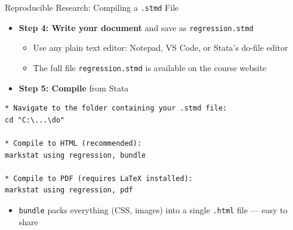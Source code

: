 \documentclass[dvipsnames,hyperref={pdfpagelabels=false}]{beamer}
\begin{document}
\begin{frame}[fragile]{Reproducible Research: Compiling a \texttt{.stmd} File}

	\begin{itemize}
		\item \textbf{Step 4: Write your document} and save as \texttt{regression.stmd}
		\vspace{0.2cm}
		\begin{itemize}
			\item Use any plain text editor: Notepad, VS Code, or Stata's do-file editor
			\vspace{0.1cm}
			\item The full file \texttt{regression.stmd} is available on the course website
		\end{itemize}
		\vspace{0.3cm}
		\item \textbf{Step 5: Compile} from Stata
	\end{itemize}

\begin{lstlisting}
* Navigate to the folder containing your .stmd file:
cd "C:\...\do"

* Compile to HTML (recommended):
markstat using regression, bundle

* Compile to PDF (requires LaTeX installed):
markstat using regression, pdf
\end{lstlisting}

	\begin{itemize}
		\item \texttt{bundle} packs everything (CSS, images) into a single \texttt{.html} file --- easy to share
	\end{itemize}

\end{frame}
\end{document}
